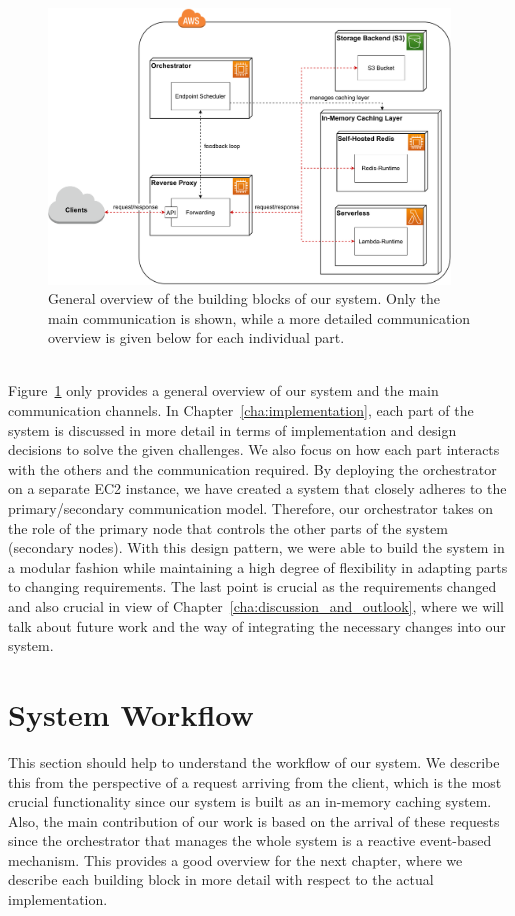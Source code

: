 \begin{figure}[ht!]
    \begin{center}
        \includegraphics[width=0.95\textwidth]{figures/system_overview.pdf}
        \caption{General overview of the building blocks of our system. Only the main communication is shown, while a more detailed communication overview is given below for each individual part.}
        \label{fig:system_overview}
    \end{center}
\end{figure}

~\\
Figure~\ref{fig:system_overview} only provides a general overview of our system and the main communication channels. In Chapter~\ref{cha:implementation}, each part of the system is discussed in more detail in terms of implementation and design decisions to solve the given challenges. We also focus on how each part interacts with the others and the communication required. By deploying the orchestrator on a separate EC2 instance, we have created a system that closely adheres to the primary/secondary communication model. Therefore, our orchestrator takes on the role of the primary node that controls the other parts of the system (secondary nodes). With this design pattern, we were able to build the system in a modular fashion while maintaining a high degree of flexibility in adapting parts to changing requirements. The last point is crucial as the requirements changed and also crucial in view of Chapter~\ref{cha:discussion_and_outlook}, where we will talk about future work and the way of integrating the necessary changes into our system.

\section{System Workflow}
\label{sec:system_workflow}
This section should help to understand the workflow of our system. We describe this from the perspective of a request arriving from the client, which is the most crucial functionality since our system is built as an in-memory caching system. Also, the main contribution of our work is based on the arrival of these requests since the orchestrator that manages the whole system is a reactive event-based mechanism. This provides a good overview for the next chapter, where we describe each building block in more detail with respect to the actual implementation.

